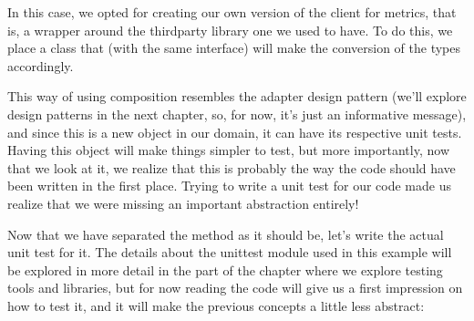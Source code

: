 \documentclass[a4paper,10pt,english]{sphinxmanual}
\begin{document}
In this case, we opted for creating our own version of the client for metrics, that is, a
wrapper around the third\sphinxhyphen{}party library one we used to have. To do this, we place a class
that (with the same interface) will make the conversion of the types accordingly.

This way of using composition resembles the adapter design pattern (we’ll explore design
patterns in the next chapter, so, for now, it’s just an informative message), and since this is a
new object in our domain, it can have its respective unit tests. Having this object will make
things simpler to test, but more importantly, now that we look at it, we realize that this is
probably the way the code should have been written in the first place. Trying to write a unit
test for our code made us realize that we were missing an important abstraction entirely!

Now that we have separated the method as it should be, let’s write the actual unit test for it.
The details about the unittest module used in this example will be explored in more
detail in the part of the chapter where we explore testing tools and libraries, but for now
reading the code will give us a first impression on how to test it, and it will make the
previous concepts a little less abstract:

\begin{sphinxVerbatim}[commandchars=\\\{\}]
 
   


 
     
          
          
         
         
\end{sphinxVerbatim}
\end{document}
